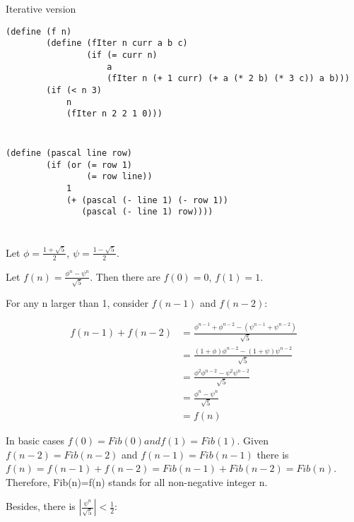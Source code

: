\documentclass[a4paper]{report}
\begin{document}
Iterative version

\begin{lstlisting}
(define (f n)
        (define (fIter n curr a b c)
                (if (= curr n)
                    a
                    (fIter n (+ 1 curr) (+ a (* 2 b) (* 3 c)) a b)))
        (if (< n 3)
            n
            (fIter n 2 2 1 0)))
\end{lstlisting}


\section{}

\begin{lstlisting}
(define (pascal line row)
        (if (or (= row 1)
                (= row line))
            1
            (+ (pascal (- line 1) (- row 1))
               (pascal (- line 1) row))))
\end{lstlisting}


\section{}

Let $\phi = \frac{1 + \sqrt{5}}{2}$, $\psi = \frac{1 - \sqrt{5}}{2}$.

Let $f(n) = \frac{\phi ^ n - \psi ^ n}{\sqrt{5}}$. Then there are $f(0) = 0$, $f(1) = 1$.

For any n larger than 1, consider $f(n - 1)$ and $f(n - 2)$:

\begin{align*}
f(n-1) + f(n-2) &= \frac{\phi^{n-1} + \phi^{n-2}-(\psi^{n-1}+\psi^{n-2})}{\sqrt{5}} \\
                &= \frac{(1+\phi)\phi^{n-2}-(1+\psi)\psi^{n-2}}{\sqrt{5}} \\
                &= \frac{\phi^2\phi^{n-2}-\psi^2\psi^{n-2}}{\sqrt{5}} \\
                &= \frac{\phi^n-\psi^n}{\sqrt{5}} \\
                &= f(n)
\end{align*}

In basic cases $f(0)=Fib(0) and f(1)=Fib(1)$. Given $f(n-2)=Fib(n-2)$ and
 $f(n-1)=Fib(n-1)$ there is
 $f(n)=f(n-1)+f(n-2)=Fib(n-1)+Fib(n-2)=Fib(n)$. Therefore, Fib(n)=f(n)
 stands for all non-negative integer n.

Besides, there is $|\frac{\psi^n}{\sqrt{5}}|<\frac{1}{2}$:
\end{document}

